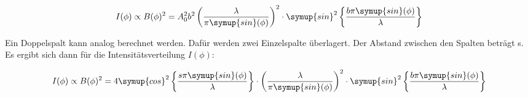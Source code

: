 \begin{equation}
  I(\phi) \propto B(\phi)^2 =
  A_0^2 b^2 \left( \frac{\lambda}{\pi \symup{sin}(\phi)} \right)^2
  \cdot \symup{sin}^2 \left\{ \frac{b \pi \symup{sin}(\phi)}{\lambda} \right\}
  \label{eqn:Einzelspalt}
\end{equation}

Ein Doppelspalt kann analog berechnet werden.
Dafür werden zwei Einzelspalte überlagert.
Der Abstand zwischen den Spalten beträgt s.
Es ergibt sich dann für die Intensitätsverteilung $I(\phi)$:

\begin{equation}
  I(\phi) \propto B(\phi)^2 =
  4 \symup{cos}^2 \left\{ \frac{s \pi \symup{sin}(\phi)}{\lambda} \right\}
  \cdot \left( \frac{\lambda}{\pi \symup{sin}(\phi)} \right)^2
  \cdot \symup{sin}^2 \left\{ \frac{b \pi \symup{sin}(\phi)}{\lambda} \right\}
\end{equation}
